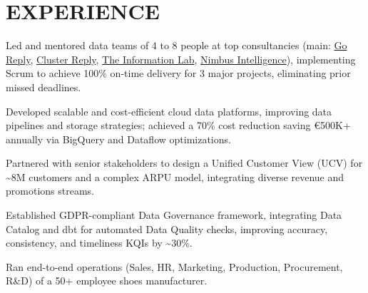 \documentclass[]{deedy-resume-cv}
\begin{document}
\begin{minipage}[t]{0.60\textwidth}


\section{EXPERIENCE}

\vspace{\topsep} %
\begin{tightemize}
\item Led and mentored data teams of 4 to 8 people at top consultancies (main: \href{https://www.reply.com/go-reply/}{Go Reply}, \href{https://www.reply.com/cluster-reply/}{Cluster Reply}, \href{https://www.theinformationlab.it/}{The Information Lab}, \href{https://nimbusintelligence.com/}{Nimbus Intelligence}), implementing Scrum to achieve 100\% on-time delivery for 3 major projects, eliminating prior missed deadlines.

\item Developed scalable and cost-efficient cloud data platforms, improving data pipelines and storage strategies; achieved a 70\% cost reduction saving €500K+ annually via BigQuery and Dataflow optimizations.

\item Partnered with senior stakeholders to design a Unified Customer View (UCV) for \~{}8M customers and a complex ARPU model, integrating diverse revenue and promotions streams.

\item Established GDPR-compliant Data Governance framework, integrating Data Catalog and dbt for automated Data Quality checks, improving accuracy, consistency, and timeliness KQIs by \~{}30\%.
\end{tightemize}

\sectionsep
{}
\begin{tightemize}
\item Ran end-to-end operations (Sales, HR, Marketing, Production, Procurement, R\&D) of a 50+ employee shoes manufacturer.


\end{tightemize}
\end{minipage}
\end{document}
